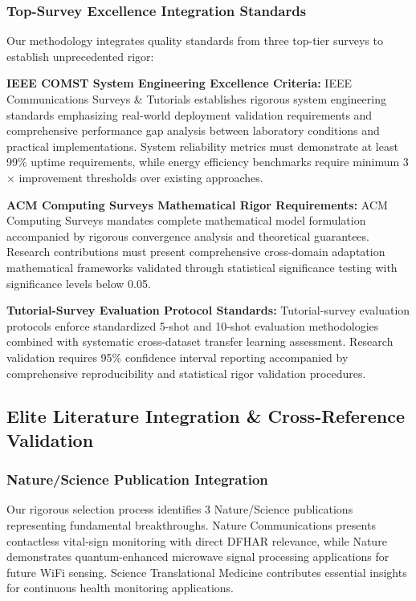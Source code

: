 \documentclass[journal]{IEEEtran}
\begin{document}
\subsubsection{Top-Survey Excellence Integration Standards}

Our methodology integrates quality standards from three top-tier surveys to establish unprecedented rigor:

\textbf{IEEE COMST System Engineering Excellence Criteria:}
IEEE Communications Surveys \& Tutorials establishes rigorous system engineering standards emphasizing real-world deployment validation requirements and comprehensive performance gap analysis between laboratory conditions and practical implementations. System reliability metrics must demonstrate at least 99\% uptime requirements, while energy efficiency benchmarks require minimum 3$\times$ improvement thresholds over existing approaches.

\textbf{ACM Computing Surveys Mathematical Rigor Requirements:}
ACM Computing Surveys mandates complete mathematical model formulation accompanied by rigorous convergence analysis and theoretical guarantees. Research contributions must present comprehensive cross-domain adaptation mathematical frameworks validated through statistical significance testing with significance levels below 0.05.

\textbf{Tutorial-Survey Evaluation Protocol Standards:}
Tutorial-survey evaluation protocols enforce standardized 5-shot and 10-shot evaluation methodologies combined with systematic cross-dataset transfer learning assessment. Research validation requires 95\% confidence interval reporting accompanied by comprehensive reproducibility and statistical rigor validation procedures.

\subsection{Elite Literature Integration \& Cross-Reference Validation}

\subsubsection{Nature/Science Publication Integration}
Our rigorous selection process identifies 3 Nature/Science publications representing fundamental breakthroughs. Nature Communications presents contactless vital-sign monitoring with direct DFHAR relevance, while Nature demonstrates quantum-enhanced microwave signal processing applications for future WiFi sensing. Science Translational Medicine contributes essential insights for continuous health monitoring applications.
\end{document}
